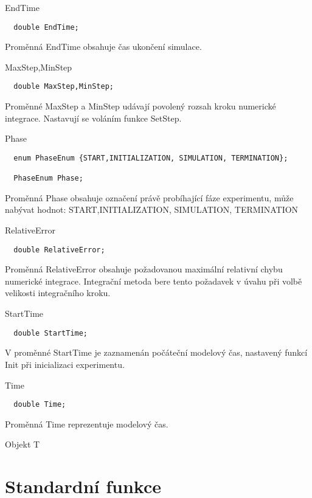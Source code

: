 \documentclass[a4paper]{article}
\begin{document}
EndTime

\begin{verbatim}
  double EndTime;
\end{verbatim}


Proměnná EndTime obsahuje čas ukončení simulace.


MaxStep,MinStep

\begin{verbatim}
  double MaxStep,MinStep;
\end{verbatim}


Proměnné MaxStep a MinStep udávají povolený rozsah
kroku numerické integrace. Nastavují se voláním funkce SetStep.


Phase

\begin{verbatim}
  enum PhaseEnum {START,INITIALIZATION, SIMULATION, TERMINATION};

  PhaseEnum Phase;
\end{verbatim}


Proměnná Phase obsahuje označení právě probíhající fáze experimentu,
může nabývat hodnot: START,INITIALIZATION, SIMULATION, TERMINATION


RelativeError

\begin{verbatim}
  double RelativeError;
\end{verbatim}


Proměnná RelativeError obsahuje požadovanou maximální relativní
chybu numerické integrace. Integrační metoda bere tento požadavek
v úvahu při volbě velikosti integračního kroku.


StartTime

\begin{verbatim}
  double StartTime;
\end{verbatim}


V proměnné StartTime je zaznamenán počáteční modelový čas,
nastavený funkcí Init při inicializaci experimentu.


Time

\begin{verbatim}
  double Time;
\end{verbatim}


Proměnná Time reprezentuje modelový čas.


Objekt T




\section{Standardní funkce}
\end{document}
